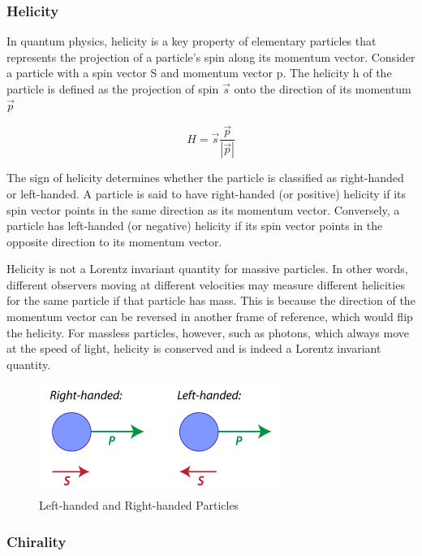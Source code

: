 \subsubsection{Helicity}

In quantum physics, helicity is a key property of elementary particles that represents the projection of a particle's spin along its momentum vector. Consider a particle with a spin vector S and momentum vector p. The helicity h of the particle is defined as the projection of spin $\Vec{s}$ onto the direction of its momentum $\Vec{p}$

\begin{equation}
    H = \Vec{s}\frac{\Vec{p}}{|\Vec{p}|}
\end{equation}

The sign of helicity determines whether the particle is classified as right-handed or left-handed. A particle is said to have right-handed (or positive) helicity if its spin vector points in the same direction as its momentum vector. Conversely, a particle has left-handed (or negative) helicity if its spin vector points in the opposite direction to its momentum vector. 

Helicity is not a Lorentz invariant quantity for massive particles. In other words, different observers moving at different velocities may measure different helicities for the same particle if that particle has mass. This is because the direction of the momentum vector can be reversed in another frame of reference, which would flip the helicity. For massless particles, however, such as photons, which always move at the speed of light, helicity is conserved and is indeed a Lorentz invariant quantity.


\begin{figure}
    \centering
    \includegraphics{images/chap2/rl_handed_particles.png}
    \caption{Left-handed and Right-handed Particles}
    \label{fig:left_right_handed_particles}
\end{figure}

\subsubsection{Chirality}

